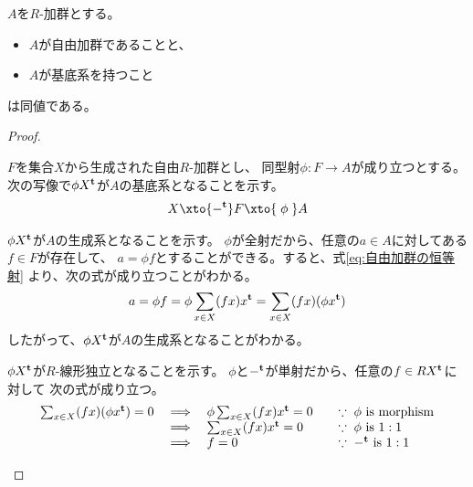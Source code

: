 {	\begin{proposition}[自由加群と基底系]\label{prop:自由加群と基底系} %
		$A$を$R$-加群とする。
		\begin{itemize}\setlength{\itemsep}{-1mm} %
			\item $A$が自由加群であることと、
			\item $A$が基底系を持つこと
		\end{itemize} %
		は同値である。
	\end{proposition} %
	\begin{proof} 
	\begin{description}\setlength{\itemsep}{-1mm} %
		\item[自由$\implies$基底] $F$を集合$X$から生成された自由$R$-加群とし、
		同型射$\phi:F\to A$が成り立つとする。
		次の写像で$\phi X^{\mathbf{t}}$が$A$の基底系となることを示す。
		\begin{equation*}\begin{split}
			X\xto{-^\tran} F\xto{\;\phi\;} A
		\end{split}\end{equation*}
		\begin{description}\setlength{\itemsep}{-1mm} %
			\item[生成系] $\phi X^{\mathbf{t}}$が$A$の生成系となることを示す。
			$\phi$が全射だから、任意の$a\in A$に対してある$f\in F$が存在して、
			$a=\phi f$とすることができる。すると、式\eqref{eq:自由加群の恒等射}
			より、次の式が成り立つことがわかる。
			\begin{equation*}\begin{split}
				a = \phi f = \phi \sum_{x\in X} (fx)x^{\mathbf{t}}
				= \sum_{x\in X} (fx)(\phi x^{\mathbf{t}})
			\end{split}\end{equation*}
			したがって、$\phi X^{\mathbf{t}}$が$A$の生成系となることがわかる。
			\item[基底系] $\phi X^{\mathbf{t}}$が$R$-線形独立となることを示す。
			$\phi$と$-^{\mathbf{t}}$が単射だから、任意の$f\in RX^{\mathbf{t}}$に対して
			次の式が成り立つ。
			\begin{equation*}\begin{array}{rcll}
				\sum_{x\in X} (fx)(\phi x^{\mathbf{t}}) = 0
				&\implies& \phi\sum_{x\in X} (fx)x^{\mathbf{t}} = 0
					& \quad\because\;\text{$\phi$ is morphism} \\
				&\implies& \sum_{x\in X} (fx)x^{\mathbf{t}} = 0
					& \quad\because\;\text{$\phi$ is $1:1$} \\
				&\implies& f = 0
					& \quad\because\;\text{$-^{\mathbf{t}}$ is $1:1$} \\

\end{array}
\end{equation*}
\end{description}
\end{description}
\end{proof}}
